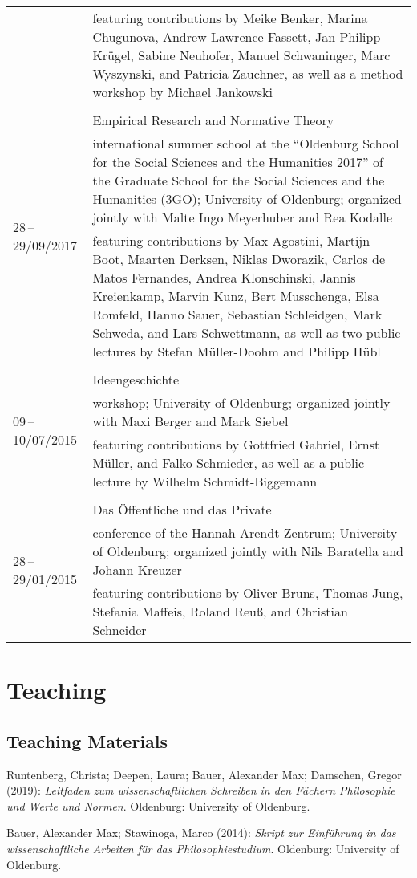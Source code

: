 \documentclass[a4paper,10pt]{article}
\newenvironment{literature}{%
   \parskip6pt\parindent0pt\raggedright
   \def\lititem{\hangindent=1cm\hangafter1}}{%
   \par\ignorespaces}
\begin{document}
\begin{longtable}{p{}p{11cm}}
& \footnotesize{featuring contributions by Meike Benker, Marina Chugunova, Andrew Lawrence Fassett, Jan Philipp Krügel, Sabine Neuhofer, Manuel Schwaninger, Marc Wyszynski, and Patricia Zauchner, as well as a method workshop by Michael Jankowski}\\
\\
\multirow{3}{2,25cm}{\footnotesize{28\,--\,29/09/2017}} & Empirical Research and Normative Theory\\
& \footnotesize{international summer school at the \enquote{Oldenburg School for the Social Sciences and the Humanities 2017} of the Graduate School for the Social Sciences and the Humanities (3GO); University of Oldenburg; organized jointly with Malte Ingo Meyerhuber and Rea Kodalle}\\
& \footnotesize{featuring contributions by Max Agostini, Martijn Boot, Maarten Derksen, Niklas Dworazik, Carlos de Matos Fernandes, Andrea Klonschinski, Jannis Kreienkamp, Marvin Kunz, Bert Musschenga, Elsa Romfeld, Hanno Sauer, Sebastian Schleidgen, Mark Schweda, and Lars Schwettmann, as well as two public lectures by Stefan Müller-Doohm and Philipp Hübl}\\
\\
\multirow{3}{2,25cm}{\footnotesize{09\,--\,10/07/2015}} & Ideengeschichte\\
& \footnotesize{workshop; University of Oldenburg; organized jointly with Maxi Berger and Mark Siebel}\\
& \footnotesize{featuring contributions by Gottfried Gabriel, Ernst Müller, and Falko Schmieder, as well as a public lecture by Wilhelm Schmidt-Biggemann}\\
\\
\multirow{3}{2,25cm}{\footnotesize{28\,--\,29/01/2015}} & Das Öffentliche und das Private\\
& \footnotesize{conference of the Hannah-Arendt-Zentrum; University of Oldenburg; organized jointly with Nils Baratella and Johann Kreuzer}\\
& \footnotesize{featuring contributions by Oliver Bruns, Thomas Jung, Stefania Maffeis, Roland Reuß, and Christian Schneider}\\
\end{longtable}


\clearpage
\section{Teaching}
\subsection*{Teaching Materials}
\begin{literature}
\lititem Runtenberg, Christa; Deepen, Laura; Bauer, Alexander Max; Damschen, Gregor (2019): \textit{Leitfaden zum wissenschaftlichen Schreiben in den Fächern Philosophie und Werte und Normen}. Oldenburg: University of Oldenburg.

\lititem Bauer, Alexander Max; Stawinoga, Marco (2014): \textit{Skript zur Einführung in das wissenschaftliche Arbeiten für das Philosophiestudium}. Oldenburg: University of Oldenburg.
\end{literature}
\end{document}

